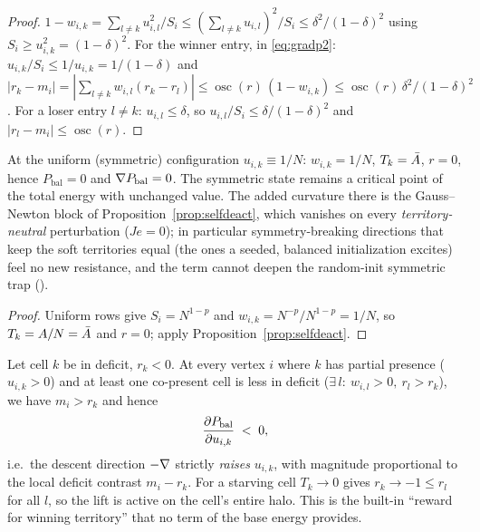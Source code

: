 \documentclass[11pt,a4paper]{article}
\begin{document}
\begin{proof}
$1-w_{i,k} = \sum_{l\neq k} u_{i,l}^2 / S_i
 \le (\sum_{l\neq k} u_{i,l})^2 / S_i \le \delta^2/(1-\delta)^2$
using $S_i \ge u_{i,k}^2=(1-\delta)^2$. For the winner entry, in
\eqref{eq:gradp2}: $u_{i,k}/S_i \le 1/u_{i,k} = 1/(1-\delta)$ and
$|r_k - m_i| = |\sum_{l\ne k} w_{i,l}(r_k - r_l)|
 \le \operatorname{osc}(r)\,(1-w_{i,k})
 \le \operatorname{osc}(r)\,\delta^2/(1-\delta)^2$.
For a loser entry $l\ne k$: $u_{i,l}\le\delta$, so
$u_{i,l}/S_i \le \delta/(1-\delta)^2$ and $|r_l-m_i|\le\operatorname{osc}(r)$.
\end{proof}

\begin{prop}
\label{prop:symmetric}
At the uniform (symmetric) configuration $u_{i,k}\equiv 1/N$:
$w_{i,k}=1/N$, $T_k=\bar{A}$, $r=0$, hence $P_{\mathrm{bal}}=0$ and
$\nabla P_{\mathrm{bal}}=0$. The symmetric state remains a critical point of
the total energy with unchanged value. The added curvature there is the
Gauss--Newton block of Proposition~\ref{prop:selfdeact}, which vanishes on
every \emph{territory-neutral} perturbation ($Je=0$); in particular
symmetry-breaking directions that keep the soft territories equal (the ones a
seeded, balanced initialization excites) feel no new resistance, and the term
cannot deepen the random-init symmetric trap
().
\end{prop}

\begin{proof}
Uniform rows give $S_i=N^{1-p}$ and $w_{i,k}=N^{-p}/N^{1-p}=1/N$, so
$T_k=A/N=\bar{A}$ and $r=0$; apply Proposition~\ref{prop:selfdeact}.
\end{proof}

\begin{prop}
\label{prop:restore}
Let cell $k$ be in deficit, $r_k<0$. At every vertex $i$ where $k$ has
partial presence ($u_{i,k}>0$) and at least one co-present cell is less in
deficit ($\exists\, l:\ w_{i,l}>0,\ r_l>r_k$), we have $m_i > r_k$ and hence
\[
  \dfrac{\partial P_{\mathrm{bal}}}{\partial u_{i,k}} \;<\; 0 ,
\]
i.e.\ the descent direction $-\nabla$ strictly \emph{raises} $u_{i,k}$, with
magnitude proportional to the local deficit contrast $m_i - r_k$. For a
starving cell $T_k\to0$ gives $r_k\to-1 \le r_l$ for all $l$, so the lift is
active on the cell's entire halo. This is the built-in ``reward for winning
territory'' that no term of the base energy provides.
\end{prop}
\end{document}
